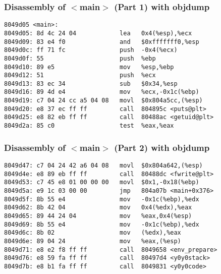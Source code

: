 \begin{frame}[fragile]
\frametitle{Disassembly of $<$main$>$ (Part 1) with objdump}
\begin{verbatim}
8049d05 <main>:
8049d05: 8d 4c 24 04            lea   0x4(%esp),%ecx
8049d09: 83 e4 f0               and   $0xfffffff0,%esp
8049d0c: ff 71 fc               push  -0x4(%ecx)
8049d0f: 55                     push  %ebp
8049d10: 89 e5                  mov   %esp,%ebp
8049d12: 51                     push  %ecx
8049d13: 83 ec 34               sub   $0x34,%esp
8049d16: 89 4d e4               mov   %ecx,-0x1c(%ebp)
8049d19: c7 04 24 cc a5 04 08   movl  $0x804a5cc,(%esp)
8049d20: e8 37 ec ff ff         call  804895c <puts@plt>
8049d25: e8 82 eb ff ff         call  80488ac <getuid@plt>
8049d2a: 85 c0                  test  %eax,%eax
\end{verbatim}
\end{frame}

\begin{frame}[fragile]
\frametitle{Disassembly of $<$main$>$ (Part 2) with objdump}

\begin{verbatim}
8049d47: c7 04 24 42 a6 04 08   movl  $0x804a642,(%esp)
8049d4e: e8 89 eb ff ff         call  80488dc <fwrite@plt>
8049d53: c7 45 e8 01 00 00 00   movl  $0x1,-0x18(%ebp)
8049d5a: e9 1c 03 00 00         jmp   804a07b <main+0x376>
8049d5f: 8b 55 e4               mov   -0x1c(%ebp),%edx
8049d62: 8b 42 04               mov   0x4(%edx),%eax
8049d65: 89 44 24 04            mov   %eax,0x4(%esp)
8049d69: 8b 55 e4               mov   -0x1c(%ebp),%edx
8049d6c: 8b 02                  mov   (%edx),%eax
8049d6e: 89 04 24               mov   %eax,(%esp)
8049d71: e8 e2 f8 ff ff         call  8049658 <env_prepare>
8049d76: e8 59 fa ff ff         call  80497d4 <y0y0stack>
8049d7b: e8 b1 fa ff ff         call  8049831 <y0y0code>
\end{verbatim}

\end{frame}




